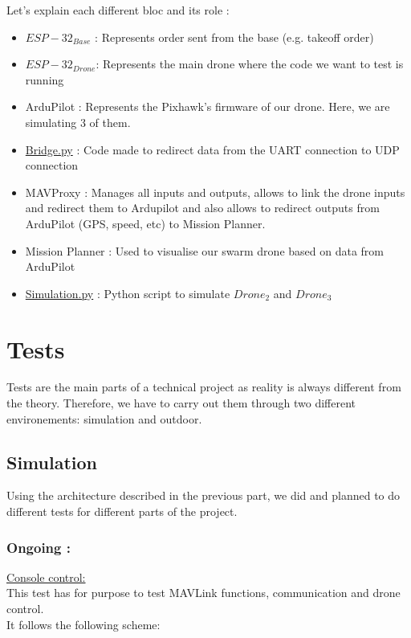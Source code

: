 Let's explain each different bloc and its role : 
\begin{itemize}
    \item $ESP-32_{Base}$ : Represents order sent from the base (e.g. takeoff order) 
    \item $ESP-32_{Drone}$: Represents the main drone where the code we want to test is running
    \item ArduPilot : Represents the Pixhawk's firmware of our drone. Here, we are simulating 3 of them. 
    \item \href{https://github.com/M1chigan/Projet-S-IoT-Essaim-de-Drone/blob/main/Simulation/Script%20d'essai/Bridge.py}{Bridge.py} : Code made to redirect data from the UART connection to UDP connection 
    \item MAVProxy : Manages all inputs and outputs, allows to link the drone inputs and redirect them to Ardupilot and also allows to redirect outputs from ArduPilot (GPS, speed, etc) to Mission Planner.
    \item Mission Planner : Used to visualise our swarm drone based on data from ArduPilot
    \item \href{https://github.com/M1chigan/Projet-S-IoT-Essaim-de-Drone/blob/main/Simulation/Script%20d'essai/Simulation.py}{Simulation.py}  : Python script to simulate $Drone_2$ and $Drone_3$
\end{itemize}


\newpage
\section{Tests}
Tests are the main parts of a technical project as reality is always different from the theory. Therefore, we have to carry out them through two different environements: simulation and outdoor.
\subsection{Simulation}
Using the architecture described in the previous part, we did and planned to do different tests for different parts of the project.  
\subsubsection{Ongoing : }
\label{Simu-level1}
\underline{Console control:} \\
This test has for purpose to test MAVLink functions, communication and drone control.\\ 
\noindent It follows the following scheme: \\

